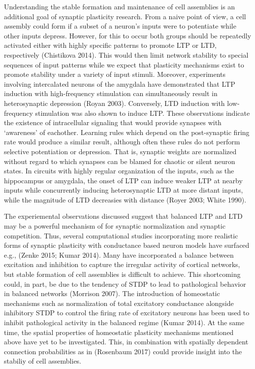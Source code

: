 \documentclass{ucetd}
\begin{document}
Understanding the stable formation and maintenance of cell assemblies is an additional goal of synaptic plasticity research. From a naive point of view, a cell assembly could form if a subset of a neuron's inputs were to potentiate while other inputs depress. However, for this to occur both groups should be repeatedly activated either with highly specific patterns to promote LTP or LTD, respectively (Chistikova 2014). This would then limit network stability to special sequences of input patterns while we expect that plasticity mechanisms exist to promote stability under a variety of input stimuli. Moreover, experiments involving intercalated neurons of the amygdala have demonstrated that LTP induction with high-frequency stimulation can simultaneously result in heterosynaptic depression (Royan 2003). Conversely, LTD induction with low-frequency stimulation was also shown to induce LTP. These observations indicate the existence of intracellular signaling that would provide synapses with `awareness' of eachother. Learning rules which depend on the post-synaptic firing rate would produce a similar result, although often these rules do not perform selective potentiation or depression. That is, synaptic weights are normalized without regard to which synapses can be blamed for chaotic or silent neuron states. In circuits with highly regular organization of the inputs, such as the hippocampus or amygdala, the onset of LTP can induce weaker LTP at nearby inputs while concurrently inducing heterosynaptic LTD at more distant inputs, while the magnitude of LTD decreasies with distance (Royer 2003; White 1990).

The experiemental observations discussed suggest that balanced LTP and LTD may be a powerful mechanism of for synaptic normalization and synaptic competition. Thus, several computational studies incorporating more realistic forms of synaptic plasticity with conductance based neuron models have surfaced e.g., (Zenke 2015; Kumar 2014). Many have incorporated a balance between excitation and inhibition to capture the irregular activity of cortical networks, but stable formation of cell assemblies is difficult to achieve. This shortcoming could, in part, be due to the tendency of STDP to lead to pathological behavior in balanced networks (Morrison 2007). The introduction of homeostatic mechanisms such as normalization of total excitatory conductance alongside inhibitory STDP to control the firing rate of excitatory neurons has been used to inhibit pathological activity in the balanced regime (Kumar 2014). At the same time, the spatial properties of homeostatic plasticity mechanisms mentioned above have yet to be investigated. This, in combination with spatially dependent connection probabilities as in (Rosenbaum 2017) could provide insight into the stabiliy of cell assemblies.
\end{document}
